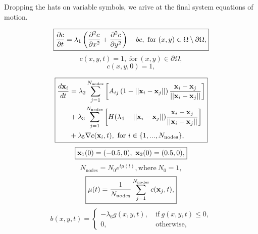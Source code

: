 Dropping the hats on variable symbols, we arive at the final system equations of motion.
\newpage


\begin{equation} \label{eqn:EOMs_PDE}
    \boxed{\pdv{c}{t} = \lambda_1 \left(\pdv[2]{c}{x} + \pdv[2]{c}{y} \right) - bc,
     \ \textrm{for} \ (x,y) \in \Omega \setminus \partial \Omega,}
\end{equation}
\begin{equation} \label{eqn:EOMs_PDE_boundary}
    \boxed{c(x,y,t) = 1, \ \textrm{for} \ (x,y) \in \partial \Omega,}
\end{equation}
\begin{equation} \label{eqn:EOMs_PDE_initial}
    \boxed{c(x,y,0) = 1,}
\end{equation}

\begin{equation} \label{eqn:EOMs_ODEs}
    \boxed{
    \begin{split}
        \frac{d \vb{x}_i}{d t} 
         &= \lambda_2 \sum_{j=1}^{N_{\textrm{nodes}}} \left[ A_{ij}\left( 1- ||\vb{x}_i - \vb{x}_j|| \right) \frac{\vb{x}_i - \vb{x}_j}{||\vb{x}_i - \vb{x}_j||} \right]\\
         &+ \lambda_3 \sum_{j=1}^{N_{\textrm{nodes}}} \left[H(\lambda_4 - ||\vb{x}_i - \vb{x}_j||) \frac{\vb{x}_i - \vb{x}_j}{||\vb{x}_i - \vb{x}_j||}     \right]\\ 
         &+ \lambda_5 \nabla c (\vb{x}_i, t), \ \textrm{for} \ i \in \{ 1, ...,N_{\textrm{nodes}} \},  
    \end{split}}
\end{equation}
\begin{equation} \label{eqn:EOMs_ODEs_initial}
    \boxed{\vb{x}_1(0) = (-0.5, 0), \ \vb{x}_2(0) = (0.5, 0), }
\end{equation}
\begin{equation} \label{eqn:EOMs_N_nodes}
    \boxed{N_{\textrm{nodes}} = N_0 e^{t \mu(t)}, \textrm{where} \ N_0 = 1, }
\end{equation}
\begin{equation} \label{eqn:EOMs_growth_rate}
    \boxed{\mu(t) = \frac{1}{N_{\textrm{nodes}}}\sum_{j=1}^{N_{\textrm{nodes}}} c(\vb{x}_j, t), } 
\end{equation}
\begin{equation}
    \boxed{
    b(x,y,t) = 
    \begin{cases}
        -\lambda_6 g(x,y,t), & \ \textrm{if} \ g(x,y,t) \leq 0, \\
            0, &    \ \textrm{otherwise},
    \end{cases}
    }
\end{equation}
